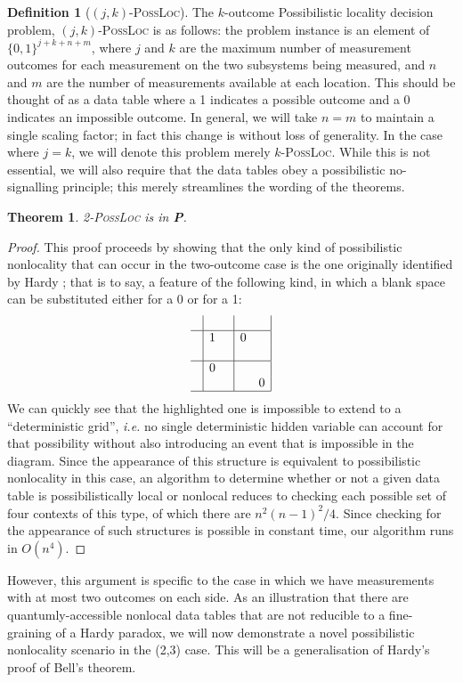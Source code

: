\documentclass[reprint]{revtex4-1}
\newtheorem{thm}{Theorem}
\theoremstyle{definition}
\newtheorem{defn}{Definition}
\begin{document}
\begin{defn}[$(j,k)$-\textsc{PossLoc}]
The $k$-outcome Possibilistic locality decision problem, $(j,k)$-\textsc{PossLoc} is as follows: the problem instance is an element of $\{0,1\}^{j+k+n+m}$, where $j$ and $k$ are the maximum number of measurement outcomes for each measurement on the two subsystems being measured, and $n$ and $m$ are the number of measurements available at each location. This should be thought of as a data table where a 1 indicates a possible outcome and a 0 indicates an impossible outcome. In general, we will take $n=m$ to maintain a single scaling factor; in fact this change is without loss of generality. In the case where $j=k$, we will denote this problem merely $k$-\textsc{PossLoc}. While this is not essential, we will also require that the data tables obey a possibilistic no-signalling principle; this merely streamlines the wording of the theorems. 
\end{defn}
\begin{thm} \cite{Mans2011}
2-\textsc{PossLoc} is in \textbf{P}.
\end{thm}
\begin{proof}
This proof proceeds by showing that the only kind of possibilistic nonlocality that can occur in the two-outcome case is the one originally identified by Hardy \cite{Hard1993}; that is to say, a feature of the following kind, in which a blank space can be substituted either for a 0 or for a 1:
\begin{equation*}
\begin{array}{c| c c | c c |}
&&&&\\ \hline
&1 & & 0 & \\
&& & & \\ \hline
&0& & &  \\
&& & & 0 \\ \hline
\end{array}
\end{equation*}
We can quickly see that the highlighted one is impossible to extend to a ``deterministic grid'', \emph{i.e.} no single deterministic hidden variable can account for that possibility without also introducing an event that is impossible in the diagram. Since the appearance of this structure is equivalent to possibilistic nonlocality in this case, an algorithm to determine whether or not a given data table is possibilistically local or nonlocal reduces to checking each possible set of four contexts of this type, of which there are $n^2(n-1)^2/4$. Since checking for the appearance of such structures is possible in constant time, our algorithm runs in $O(n^4)$.
\end{proof}
However, this argument is specific to the case in which we have measurements with at most two outcomes on each side. As an illustration that there are quantumly-accessible nonlocal data tables that are not reducible to a fine-graining of a Hardy paradox, we will now demonstrate a novel possibilistic nonlocality scenario in the (2,3) case. This will be a generalisation of Hardy's proof of Bell's theorem.
\end{document}

